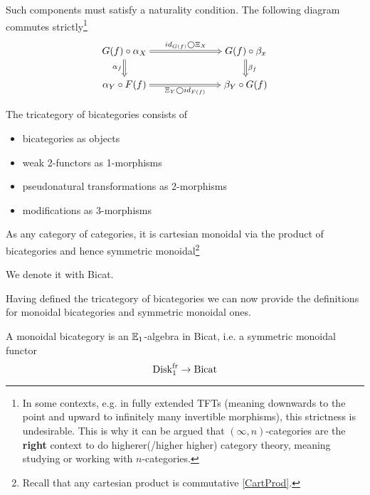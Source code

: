 \begin{defn}[Modification]
Such components must satisfy a naturality condition. The following diagram commutes strictly\footnote{
In some contexts, e.g. in fully extended TFTs (meaning downwards to the point and upward to 
infinitely many invertible morphisms), this strictness is undesirable. This is why 
it can be argued that $(\infty,n)$-categories are the \textbf{right} context to do higherer(/higher higher)
 category theory, meaning studying or working with $n$-categories.}
\[\begin{tikzcd}[cramped]
    {G(f)\circ\alpha_X} &&& {G(f)\circ \beta_x} \\
    {\alpha_Y\circ F(f)} &&& {\beta_Y\circ G(f)}
    \arrow["{\alpha_f}"', Rightarrow, from=1-1, to=2-1]
    \arrow["{\Xi_Y\bigcirc id_{F(f)}}"', Rightarrow, from=2-1, to=2-4]
    \arrow["{ id_{G(f)}\bigcirc\Xi_X}", Rightarrow, from=1-1, to=1-4]
    \arrow["{\beta_f}", Rightarrow, from=1-4, to=2-4]
\end{tikzcd}\]
\end{defn}
     \begin{defn}
The tricategory of bicategories consists of
\begin{itemize}
    \item bicategories as objects
    \item weak 2-functors as 1-morphisms
    \item pseudonatural transformations as 2-morphisms
    \item modifications as 3-morphisms
\end{itemize}
As any category of categories, it is cartesian monoidal via the product of bicategories and hence
 symmetric monoidal\footnote{Recall that any cartesian product is commutative \ref{CartProd}.}

We denote it with Bicat.
     \end{defn}
     Having defined the tricategory of bicategories we can now provide the definitions for 
     monoidal bicategories and symmetric monoidal ones.
     \begin{defn}
        A monoidal bicategory is an $\mathbb{E}_1$-algebra in Bicat, i.e. a symmetric monoidal functor
        $$\operatorname{Disk}_{1}^{\operatorname{fr}}\to\operatorname{Bicat}$$
     \end{defn}
